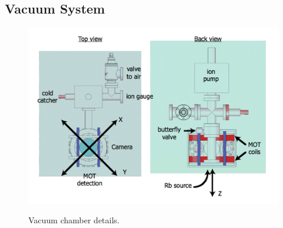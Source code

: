 \documentclass{../lab}
\begin{document}


\subsection{Vacuum System}

\begin{figure}[h]
    \centering
    \href{http://experimentationlab.berkeley.edu/sites/default/files/images/500px-MOTimage008.png}{\includegraphics[width=0.5\linewidth]{images/500px-MOTimage008.png}}
    \caption{Vacuum chamber details.}
    \label{fig:VacuumChamberDetails}
\end{figure}
\end{document}
